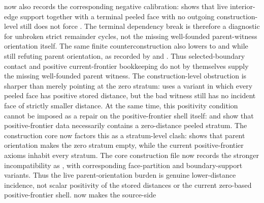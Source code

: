 \documentclass[11pt]{article}
\begin{document}
now also records the corresponding negative calibration:
shows that live interior-edge support together with a terminal peeled face with
no outgoing construction-level  still does not force
.  The
terminal dependency break is therefore a diagnostic for unbroken strict
remainder cycles, not the missing well-founded parent-witness orientation
itself.
The same finite counterconstruction also lowers to
 and
 while still
refuting parent orientation, as recorded by
and
.
Thus selected-boundary contact and positive current-frontier bookkeeping do not
by themselves supply the missing well-founded parent witness.
The construction-level obstruction is sharper than merely pointing at the
zero stratum:
uses a variant in which every peeled face has positive stored distance, but the
bad witness still has no incident face of strictly smaller distance.  At the
same time, this positivity condition cannot be imposed as a repair on the
positive-frontier shell itself:
and
show that positive-frontier data necessarily contains a zero-distance peeled
stratum.  The construction core now factors this as a stratum-level clash:
shows that parent orientation makes the zero stratum empty, while the current
positive-frontier axioms inhabit every stratum.  The core construction file now
records the stronger incompatibility as
,
with corresponding face-partition and boundary-support variants.  Thus the
live parent-orientation burden is genuine lower-distance incidence, not scalar
positivity of the stored distances or the current zero-based positive-frontier
shell.
 now makes the source-side
\end{document}
